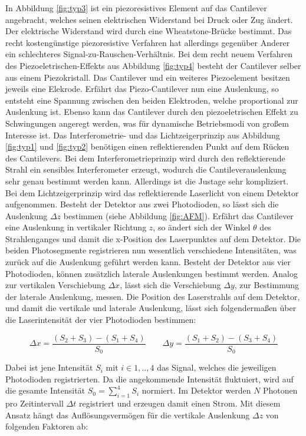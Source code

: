 \noindent
In Abbildung \ref{fig:typ3} ist ein piezoresistives Element auf das Cantilever
angebracht, welches seinen elektrischen Widerstand bei Druck oder Zug ändert.
Der elektrische Widerstand wird durch eine Wheatstone-Brücke bestimmt. Das
recht kostengünstige piezoresistive Verfahren hat allerdings gegenüber Anderer
ein schlechteres Signal-zu-Rauschen-Verhältnis.
Bei dem recht neuem Verfahren des Piezoeletrischen-Effekts aus Abbildung \ref{fig:typ4}
besteht der Cantilever selber aus einem Piezokristall. Das Cantilever und
ein weiteres Piezoelement besitzen jeweils eine Elekrode. Erfährt das Piezo-Cantilever
nun eine Auslenkung, so entsteht eine Spannung zwischen den beiden Elektroden,
welche proportional zur Auslenk{\-}ung ist. Ebenso kann das Cantilever durch den
piezoeletrischen Effekt zu Schwingungen angeregt werden, was für dynamische
Betriebsmodi von großem Interesse ist.
Das Interferometrie- und das Lichtzeigerprinzip aus Abbildung \ref{fig:typ1} und
\ref{fig:typ2} benötigen einen reflektierenden Punkt auf dem Rücken des Cantilevers.
Bei dem Interferometrieprinzip wird durch den reflektierende Strahl ein sensibles
Interferometer erzeugt, wodurch die Cantileverauslenkung sehr genau bestimmt
werden kann. Allerdings ist die Justage sehr kompliziert.
Bei dem Lichtzeigerprinzip wird das reflektierende Laserlicht von einem Detektor aufgenommen.
Besteht der Detektor aus zwei Photodioden, so lässt sich die Auslenkung $\Delta z$
bestimmen (siehe Abbildung \ref{fig:AFM}). Erfährt das Cantilever eine Auslenkung
in vertikaler Richtung $z$, so ändert sich der Winkel $\theta$ des Strahlenganges
und damit die x-Position des Laserpunktes auf dem Detektor. Die beiden
Photosegmente registrieren nun wesentlich verschiedene Intensitäten, was zurück
auf die Auslenkung geführt werden kann. Besteht der Detektor aus vier Photodioden,
können zusätzlich laterale Auslenkungen bestimmt werden. Analog zur vertikalen
Verschiebung $\Delta x$, lässt sich die Verschiebung $\Delta y$, zur Bestimmung der
laterale Auslenkung, messen. Die Position des Laserstrahls auf dem Detektor, und
damit die vertikale und laterale Auslenkung, lässt sich folgendermaßen über die
Laserintensität der vier Photodioden bestimmen:

\begin{equation}
  \Delta x = \frac{(S_2 + S_3)-(S_1 + S_4)}{S_0}
  \qquad
  \Delta y = \frac{(S_1 + S_2)-(S_3 + S_4)}{S_0}
  \label{eq:F2}
\end{equation}

\noindent
Dabei ist jene Intensität $S_i$ mit $i \in {1,..,4}$ das Signal, welches die
jeweiligen Photodioden registrierten.
Da die angekommende Intensität fluktuiert, wird auf die gesamte Intensität $S_0 = \sum_{i=1}^4 S_i$
normiert. Im Detektor werden $N$ Photonen pro Zeitintervall $\Delta t$ registriert
und erzeugen damit einen Strom. Mit diesem Ansatz hängt das Auflösungsvermögen
\cite[165]{AFM} für die vertikale Auslenkung $\Delta z$ von folgenden Faktoren ab:

